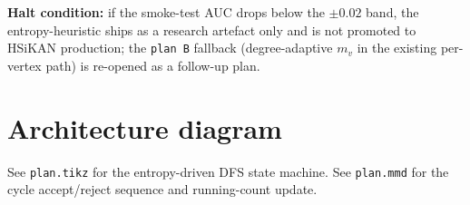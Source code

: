 \documentclass[a4paper,11pt]{article}
\begin{document}
\textbf{Halt condition:} if the smoke-test AUC drops below the
$\pm 0.02$ band, the entropy-heuristic ships as a research artefact
only and is not promoted to HSiKAN production; the \texttt{plan B}
fallback (degree-adaptive $m_v$ in the existing per-vertex path) is
re-opened as a follow-up plan.

\section*{Architecture diagram}

See \texttt{plan.tikz} for the entropy-driven DFS state machine.
See \texttt{plan.mmd} for the cycle accept/reject sequence and
running-count update.

\begin{center}

\end{center}
\end{document}
